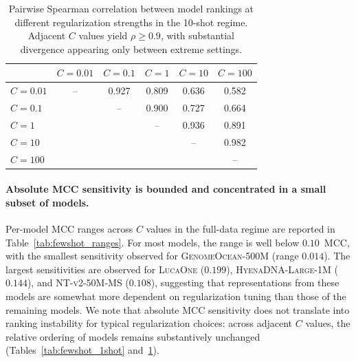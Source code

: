 \documentclass{llmxive}
\begin{document}
\begin{table}[!htbp]
\centering
\small
\begin{tabular}{@{}lccccc@{}}
\toprule
 & $C=0.01$ & $C=0.1$ & $C=1$ & $C=10$ & $C=100$ \\
\midrule
$C=0.01$  &  --    & 0.927 & 0.809 & 0.636 & 0.582 \\
$C=0.1$   &       &  --    & 0.900 & 0.727 & 0.664 \\
$C=1$     &       &       &  --    & 0.936 & 0.891 \\
$C=10$    &       &       &       &  --    & 0.982 \\
$C=100$   &       &       &       &       &  --    \\
\bottomrule
\end{tabular}
\caption{Pairwise Spearman correlation between model rankings at
different regularization strengths in the 10-shot regime. Adjacent
$C$ values yield $\rho \geq 0.9$, with substantial divergence appearing
only between extreme settings.}
\label{tab:fewshot_10shot}
\end{table}

\paragraph{Absolute MCC sensitivity is bounded and concentrated in a small subset of models.}
Per-model MCC ranges across $C$ values in the full-data regime are
reported in Table~\ref{tab:fewshot_ranges}. For most models, the range
is well below $0.10$~MCC, with the smallest sensitivity observed for
\textsc{GenomeOcean-500M} (range $0.014$). The largest sensitivities
are observed for \textsc{LucaOne} ($0.199$),
\textsc{HyenaDNA-Large-1M} ($0.144$), and \textsc{NT-v2-50M-MS}
($0.108$), suggesting that representations from these models are
somewhat more dependent on regularization tuning than those of the
remaining models. We note that absolute MCC sensitivity does not
translate into ranking instability for typical regularization choices:
across adjacent $C$ values, the relative ordering of models remains
substantively unchanged
(Tables~\ref{tab:fewshot_1shot} and~\ref{tab:fewshot_10shot}).
\end{document}

